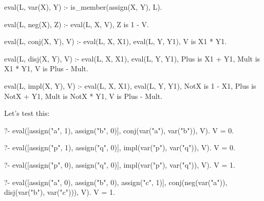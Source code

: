 


\begin{codeblock}
eval(L, var(X), Y) :-
    is_member(assign(X, Y), L).

eval(L, neg(X), Z) :-
    eval(L, X, V),
    Z is 1 - V.

eval(L, conj(X, Y), V) :-
    eval(L, X, X1),
    eval(L, Y, Y1),
    V is X1 * Y1.

eval(L, disj(X, Y), V) :-
    eval(L, X, X1),
    eval(L, Y, Y1),
    Plus is X1 + Y1,
    Mult is X1 * Y1,
    V is Plus - Mult.

eval(L, impl(X, Y), V) :-
    eval(L, X, X1),
    eval(L, Y, Y1),
    NotX is 1 - X1,
    Plus is NotX + Y1,
    Mult is NotX * Y1,
    V is Plus - Mult.
\end{codeblock}

Let's test this:

\begin{codeblock}
?- eval([assign("a", 1), assign("b", 0)], conj(var("a"), var("b")), V).
V = 0.

?- eval([assign("p", 1), assign("q", 0)], impl(var("p"), var("q")), V).
V = 0.

?- eval([assign("p", 0), assign("q", 0)], impl(var("p"), var("q")), V).
V = 1.

?- eval([assign("a", 0), assign("b", 0), assign("c", 1)], 
        conj(neg(var("a")), disj(var("b"), var("c"))), V).
V = 1.
\end{codeblock}